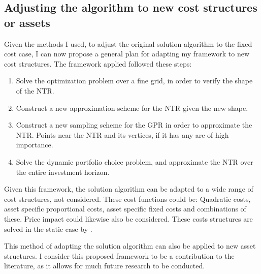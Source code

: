 \documentclass[11pt]{article}
\begin{document}
\subsection{Adjusting the algorithm to new cost structures or assets} \label{Subsection: AdjustingAlgorithm}
Given the methods I used, to adjust the original solution algorithm to the fixed cost case, I can now propose a general plan for adapting
my framework to new cost structures.
The framework applied followed these steps:
\begin{enumerate}
    \item Solve the optimization problem over a fine grid, in order to verify the shape of the NTR.
    \item Construct a new approximation scheme for the NTR given the new shape.
    \item Construct a new sampling scheme for the GPR in order to approximate the NTR. Points near the NTR and its vertices, if it has any are of high importance.
    \item Solve the dynamic portfolio choice problem, and approximate the NTR over the entire investment horizon.
\end{enumerate}
Given this framework, the solution algorithm can be adapted to a wide range of cost structures, not considered.
These cost functions could be: Quadratic costs, asset specific proportional costs,
asset specific fixed costs and combinations of these. Price impact could likewise also be considered.
These costs structures are solved in the static case by \autocite{Dybvig2020}.

This method of adapting the solution algorithm can also be applied to new asset structures.
I consider this proposed framework to be a contribution to the literature, as it allows for much future research to be conducted. 
\end{document}

